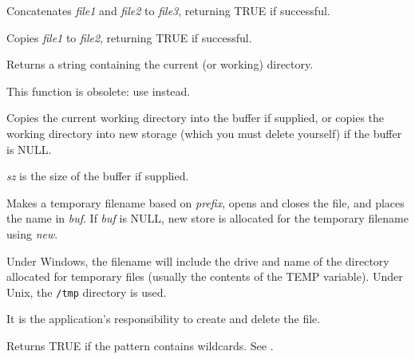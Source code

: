 Concatenates {\it file1} and {\it file2} to {\it file3}, returning
TRUE if successful.



Copies {\it file1} to {\it file2}, returning TRUE if successful.

\label{wxgetcwd}


Returns a string containing the current (or working) directory.



This function is obsolete: use  instead.

Copies the current working directory into the buffer if supplied, or
copies the working directory into new storage (which you must delete yourself)
if the buffer is NULL.

{\it sz} is the size of the buffer if supplied.




Makes a temporary filename based on {\it prefix}, opens and closes the file,
and places the name in {\it buf}. If {\it buf} is NULL, new store
is allocated for the temporary filename using {\it new}.

Under Windows, the filename will include the drive and name of the
directory allocated for temporary files (usually the contents of the
TEMP variable). Under Unix, the {\tt /tmp} directory is used.

It is the application's responsibility to create and delete the file.

\label{wxiswild}


Returns TRUE if the pattern contains wildcards. See .

\label{wxmatchwild}

